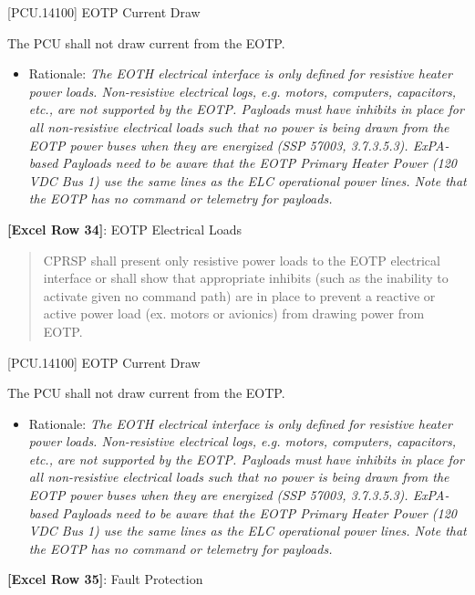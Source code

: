 [PCU.14100] EOTP Current Draw

The PCU shall not draw current from the EOTP.

\begin{itemize}
\item{} Rationale: \emph{The EOTH electrical interface is only defined for resistive heater power loads. Non-resistive electrical logs, \emph{e.g.} motors, computers, capacitors, \emph{etc.}, are not supported by the EOTP. Payloads must have inhibits in place for all non-resistive electrical loads such that no power is being drawn from the EOTP power buses when they are energized (SSP 57003, 3.7.3.5.3). ExPA-based Payloads need to be aware that the EOTP Primary Heater Power (120 VDC Bus 1) use the same lines as the ELC operational power lines. Note that the EOTP has no command or telemetry for payloads.}

\end{itemize}

\textbf{[Excel Row 34]}: EOTP Electrical Loads

\begin{quote}
CPRSP shall present only resistive power loads to the EOTP electrical interface or shall show that appropriate inhibits (such as the inability to activate given no command path) are in place to prevent a reactive or active power load (ex. motors or avionics) from drawing power from EOTP.
\end{quote}

[PCU.14100] EOTP Current Draw

The PCU shall not draw current from the EOTP.

\begin{itemize}
\item{} Rationale: \emph{The EOTH electrical interface is only defined for resistive heater power loads. Non-resistive electrical logs, \emph{e.g.} motors, computers, capacitors, \emph{etc.}, are not supported by the EOTP. Payloads must have inhibits in place for all non-resistive electrical loads such that no power is being drawn from the EOTP power buses when they are energized (SSP 57003, 3.7.3.5.3). ExPA-based Payloads need to be aware that the EOTP Primary Heater Power (120 VDC Bus 1) use the same lines as the ELC operational power lines. Note that the EOTP has no command or telemetry for payloads.}

\end{itemize}

\textbf{[Excel Row 35]}: Fault Protection

